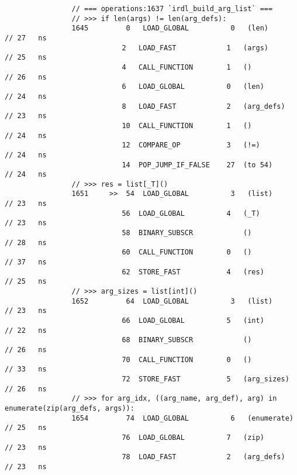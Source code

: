 \begin{code}
\begin{verbatim}
                // === operations:1637 `irdl_build_arg_list` ===
                // >>> if len(args) != len(arg_defs):
                1645         0   LOAD_GLOBAL          0   (len)                                     // 27   ns
                            2   LOAD_FAST            1   (args)                                     // 25   ns
                            4   CALL_FUNCTION        1   ()                                         // 26   ns
                            6   LOAD_GLOBAL          0   (len)                                      // 24   ns
                            8   LOAD_FAST            2   (arg_defs)                                 // 23   ns
                            10  CALL_FUNCTION        1   ()                                         // 24   ns
                            12  COMPARE_OP           3   (!=)                                       // 24   ns
                            14  POP_JUMP_IF_FALSE    27  (to 54)                                    // 24   ns
                // >>> res = list[_T]()
                1651     >>  54  LOAD_GLOBAL          3   (list)                                    // 23   ns
                            56  LOAD_GLOBAL          4   (_T)                                       // 23   ns
                            58  BINARY_SUBSCR            ()                                         // 28   ns
                            60  CALL_FUNCTION        0   ()                                         // 37   ns
                            62  STORE_FAST           4   (res)                                      // 25   ns
                // >>> arg_sizes = list[int]()
                1652         64  LOAD_GLOBAL          3   (list)                                    // 23   ns
                            66  LOAD_GLOBAL          5   (int)                                      // 22   ns
                            68  BINARY_SUBSCR            ()                                         // 26   ns
                            70  CALL_FUNCTION        0   ()                                         // 33   ns
                            72  STORE_FAST           5   (arg_sizes)                                // 26   ns
                // >>> for arg_idx, ((arg_name, arg_def), arg) in enumerate(zip(arg_defs, args)):
                1654         74  LOAD_GLOBAL          6   (enumerate)                               // 25   ns
                            76  LOAD_GLOBAL          7   (zip)                                      // 23   ns
                            78  LOAD_FAST            2   (arg_defs)                                 // 23   ns

\end{verbatim}
\end{code}
